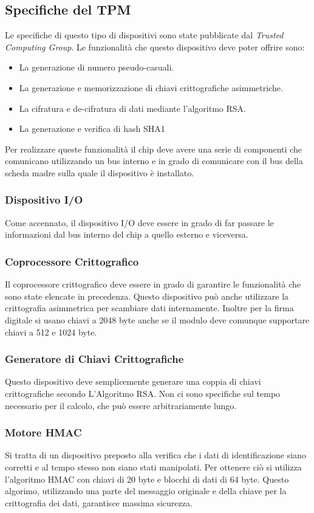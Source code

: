 \subsection{Specifiche del TPM}
Le specifiche di questo tipo di dispositivi sono state pubblicate dal \textit{Trusted Computing Group}. Le funzionalità che questo dispositivo deve poter offrire sono:
\begin{itemize}
    \item La generazione di numero pseudo-casuali.
    \item La generazione e memorizzazione di chiavi crittografiche asimmetriche.
    \item La cifratura e de-cifratura di dati mediante l'algoritmo RSA.
    \item La generazione e verifica di hash SHA1
\end{itemize}
Per realizzare queste funzionalità il chip deve avere una serie di componenti che comunicano utilizzando un bus interno e in grado di comunicare con il bus della scheda madre sulla quale il dispositivo è installato.

\subsubsection{Dispositivo I/O}
Come accennato, il dispositivo I/O deve essere in grado di far passare le informazioni dal bus interno del chip a quello esterno e viceversa.

\subsubsection{Coprocessore Crittografico}
Il coprocessore crittografico deve essere in grado di garantire le funzionalità che sono state elencate in precedenza. Questo dispositivo può anche utilizzare la crittografia asimmetrica per scambiare dati internamente. Inoltre per la firma digitale si usano chiavi a 2048 byte anche se il modulo deve comunque supportare chiavi a 512 e 1024 byte.

\subsubsection{Generatore di Chiavi Crittografiche}
Questo dispositivo deve semplicemente generare una coppia di chiavi crittografiche secondo L'Algoritmo RSA. Non ci sono specifiche sul tempo necessario per il calcolo, che può essere arbitrariamente lungo.

\subsubsection{Motore HMAC}
Si tratta di un dispositivo preposto alla verifica che i dati di identificazione siano corretti e al tempo stesso non siano stati manipolati. Per ottenere ciò si utilizza l'algoritmo HMAC con chiavi di 20 byte e blocchi di dati di 64 byte. Questo algorimo, utilizzando una parte del messaggio originale e della chiave per la crittografia dei dati, garantisce massima sicurezza.


